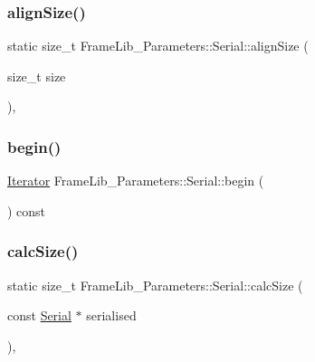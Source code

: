 \subsubsection{\texorpdfstring{align\+Size()}{alignSize()}}
{\footnotesize\ttfamily static size\+\_\+t Frame\+Lib\+\_\+\+Parameters\+::\+Serial\+::align\+Size (\begin{DoxyParamCaption}\item[{size\+\_\+t}]{size }\end{DoxyParamCaption})\hspace{0.3cm}{\ttfamily [inline]}, {\ttfamily [static]}}

\mbox{\label{class_frame_lib___parameters_1_1_serial_ab77262d400858fad2affc7d9bb10f175}} 
\subsubsection{\texorpdfstring{begin()}{begin()}}
{\footnotesize\ttfamily \hyperlink{class_frame_lib___parameters_1_1_serial_1_1_iterator}{Iterator} Frame\+Lib\+\_\+\+Parameters\+::\+Serial\+::begin (\begin{DoxyParamCaption}{ }\end{DoxyParamCaption}) const\hspace{0.3cm}{\ttfamily [inline]}}

\mbox{\label{class_frame_lib___parameters_1_1_serial_ad0ef941c4f0461a59b4cdd303d7e1c89}} 
\subsubsection{\texorpdfstring{calc\+Size()}{calcSize()}\hspace{0.1cm}{\footnotesize\ttfamily [1/4]}}
{\footnotesize\ttfamily static size\+\_\+t Frame\+Lib\+\_\+\+Parameters\+::\+Serial\+::calc\+Size (\begin{DoxyParamCaption}\item[{const \hyperlink{class_frame_lib___parameters_1_1_serial}{Serial} $\ast$}]{serialised }\end{DoxyParamCaption})\hspace{0.3cm}{\ttfamily [inline]}, {\ttfamily [static]}}

